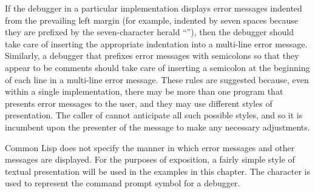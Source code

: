 \beforenoterule
\begin{implementation}
If the debugger in a particular implementation
displays error messages indented from the prevailing left margin
(for example, indented by seven spaces because
they are prefixed by the seven-character herald ``''),
then the debugger should take care of inserting
the appropriate indentation into a multi-line error message.
Similarly, a debugger that prefixes error messages with semicolons
so that they appear to be comments
should take care of inserting a semicolon at the beginning of each
line in a multi-line error message.  These rules are suggested
because, even within a single
implementation, there may be more than one program that presents error
messages to the user, and they may use different styles of
presentation.  The caller
of  cannot anticipate all such possible styles,
and so it is incumbent upon the presenter of the message
to make any necessary adjustments.
\end{implementation}
\afternoterule

Common Lisp does not specify the manner in which error messages and
other messages are displayed.  For the purposes of exposition,
a fairly simple style of textual presentation will be used in the
examples in this chapter.  The character \cdf{>} is used
to represent the command prompt symbol for a debugger.

